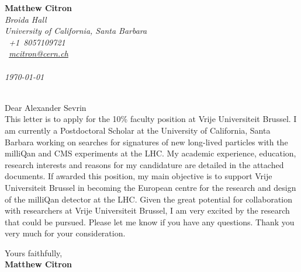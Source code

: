 \documentclass[12pt]{article}
\begin{document}
\sffamily   %
\hfill%
\begin{minipage}[t]{.6\textwidth}
\raggedleft%
{\bfseries Matthew Citron}\\[.35ex]
\small\itshape%
Broida Hall\\ University of California, Santa Barbara\\
\Telefon~+1~8057109721\\
\Letter~\href{mailto:mcitron@cern.ch}{mcitron@cern.ch}\\~\\

\today
\end{minipage}\\[1em]
%
\hfill %
Dear Alexander Sevrin\\[1.5em]
%
This letter is to apply for the 10\% faculty position at Vrije Universiteit Brussel. I am currently a Postdoctoral
Scholar at the University of California, Santa Barbara working on searches for signatures of 
new long-lived particles with the milliQan and CMS experiments at the LHC.
My academic experience, education, research interests and reasons for my candidature are
detailed in the attached documents. If awarded this position, my main objective is to
support Vrije Universiteit Brussel in becoming the European centre for 
the research and design of the milliQan detector at the LHC. Given the great potential 
for collaboration with researchers at Vrije Universiteit Brussel, I am very excited by the
research that could be pursued. Please let me know if you have any questions. 
Thank you very much for your consideration.

Yours faithfully,\\[2em] %
%
{\bfseries Matthew Citron}\\
%
\vfill%
\end{document}

